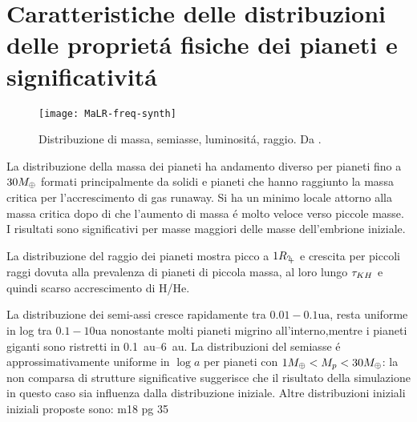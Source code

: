 \clearpage

\section{Caratteristiche delle distribuzioni delle propriet\'a fisiche dei pianeti e significativit\'a}

\begin{figure}[!ht]
	\texttt{[image: MaLR-freq-synth]}
	\caption{Distribuzione di massa, semiasse, luminosit\'a, raggio. Da \cite{mordasini2018planetary}. }\label{fig:MaLR-freq-synth}
\end{figure}

La distribuzione della massa dei pianeti ha andamento diverso per pianeti fino a $30M_{\oplus}{}$ formati principalmente da solidi e pianeti che hanno raggiunto la massa critica per l'accrescimento di gas runaway.
Si ha un minimo locale attorno alla massa critica dopo di che l'aumento di massa \'e molto veloce verso piccole masse. I risultati sono significativi per masse maggiori delle masse dell'embrione iniziale.

La distribuzione del raggio dei pianeti mostra picco a $1\rjupiter$ e crescita per piccoli raggi dovuta alla prevalenza di pianeti di piccola massa, al loro lungo $\tau_{KH}{}$ e quindi scarso accrescimento di H/He.

La distribuzione dei semi-assi cresce rapidamente tra $0.01-0.1\si{\astronomicalunit}$, resta uniforme in log tra $0.1-10\si{\astronomicalunit}$ nonostante molti pianeti migrino all'interno,mentre i pianeti giganti sono ristretti in \SIrange{0.1}{6}{\astronomicalunit}. La distribuzioni del semiasse \'e approssimativamente uniforme in $\log{a}$ per pianeti con $1M_{\oplus}{}<M_p<30M_{\oplus}{}$: la non comparsa di strutture significative suggerisce che il risultato della simulazione in questo caso sia influenza dalla distribuzione iniziale. Altre distribuzioni iniziali iniziali proposte sono:
m18 pg 35


